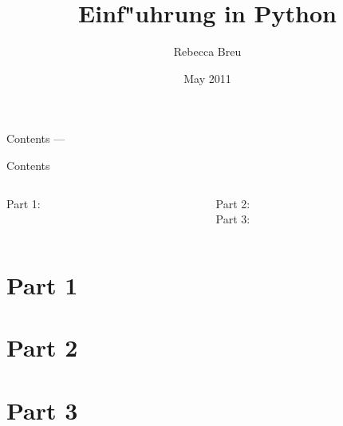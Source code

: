 \documentclass{beamer}
\title{Einf"uhrung in Python}
\date{May 2011}
\author{Rebecca Breu}
\institute
{
 Verteilte Systeme und Grid-Computing \\
 JSC\\
 Forschungszentrum J"ulich
}
\begin{document}
\AtBeginPart
{
  \begin{frame}
  \titlepage
  \end{frame}

  \begin{frame}{Contents --- \insertpart}
  \tableofcontents
  \end{frame}
}


\AtBeginSection[]
{
   \begin{frame}{\insertsection}
       \tableofcontents[currentsection]
   \end{frame}
}


\begin{frame}
\titlepage
\end{frame}

\begin{frame}{Contents}
\begin{columns}[t]

\begin{column}{0.4\textwidth}
  Part 1:\\[3mm]
  \tableofcontents[part=1]
\end{column}

\begin{column}{0.6\textwidth}
  Part 2:\\[3mm]
  \tableofcontents[part=2]
  \vspace{7mm}
  Part 3:\\[3mm]
  \tableofcontents[part=3]
\end{column}

\end{columns}
\end{frame}


\part{Part 1}









\vielspass

\part{Part 2}





\vielspass

\part{Part 3}





\vielspass
\end{document}
